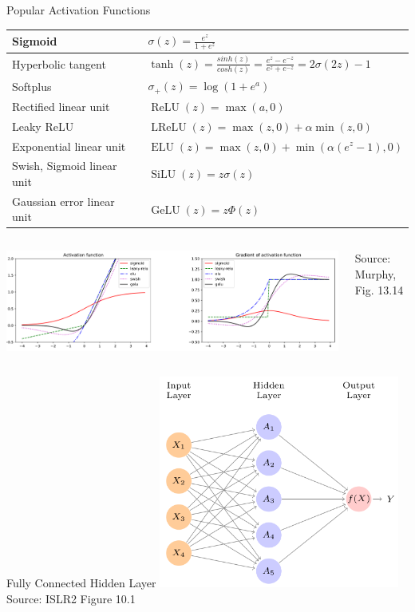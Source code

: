 \documentclass[ignorenonframetext,xcolor=x11names]{beamer}
\begin{document}
\begin{frame}{Popular Activation Functions}
\footnotesize
\renewcommand{\arraystretch}{1.5}

\begin{tabular}{l|l} 
Sigmoid & $\sigma(z) = \frac{e^z}{1+e^z}$  \\ \hline
Hyperbolic tangent & $\tanh(z)=\frac{sinh(z)}{cosh(z)} = \frac{e^z-e^{-z}}{e^z+e^{-z}} = 2\sigma(2z)-1$  \\ \hline
Softplus & $\sigma_+(z) = \log(1+e^a)$ \\ \hline
Rectified linear unit & $\operatorname{ReLU}(z) = \max(a, 0) $ \\ \hline
Leaky ReLU & $\operatorname{LReLU}(z)=\max(z, 0) + \alpha \min(z, 0)$  \\ \hline
Exponential linear unit & $\operatorname{ELU}(z) = \max(z, 0) + \min(\alpha(e^z-1), 0)$ \\ \hline
Swish, Sigmoid linear unit & $\operatorname{SiLU}(z) = z \sigma(z)$ \\ \hline
Gaussian error linear unit & $\operatorname{GeLU}(z) = z \Phi(z)$ \\ 
\end{tabular}
\vspace{\baselineskip}
\begin{columns}
\begin{column}{\textwidth}
\includegraphics[width=\textwidth]{screen6}
\end{column}
\begin{column}{0.1\textwidth}
\scriptsize Source: Murphy, Fig. 13.14
\end{column}
\end{columns}
\end{frame}



\begin{frame}{Fully Connected Hidden Layer}
\centering
\includegraphics[height=2.75in]{screen1.png} \\

\scriptsize Source: ISLR2 Figure 10.1
\end{frame}
\end{document}
